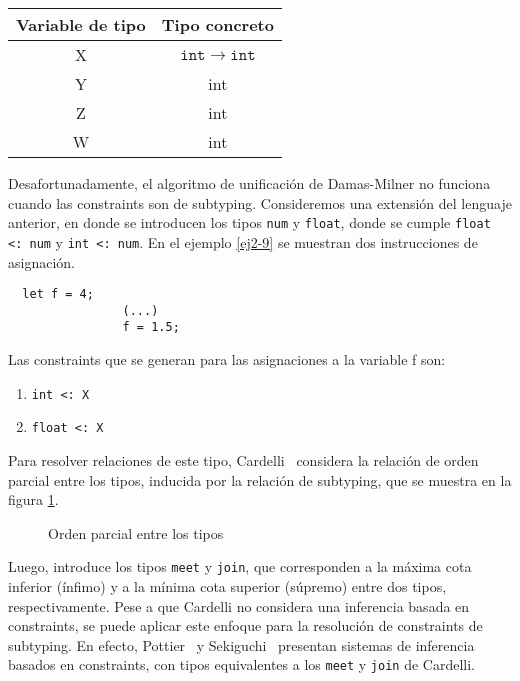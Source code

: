 \begin{center}
  \ttfamily
  \begin{tabular}{c c}
    Variable de tipo & Tipo concreto \\
    \hline
    X & $\mathtt{int \rightarrow int}$  \\
    Y & int \\
    Z & int \\
    W & int \\
  \end{tabular}
\end{center}
\clearpage
Desafortunadamente, el algoritmo de unificación de Damas-Milner no funciona cuando las constraints son de subtyping. Consideremos una extensión del lenguaje anterior,   en donde se introducen los tipos \texttt{num} y \texttt{float}, donde se cumple \texttt{float <: num} y \texttt{int <: num}. En el ejemplo \ref{ej2-9} se muestran dos instrucciones de asignación.
\vspace{0.8em}
\begin{ej}
  \normalfont
  \label{ej2-9}
\begin{lstlisting}
  let f = 4;
                (...)
                f = 1.5;
\end{lstlisting}
\end{ej}

Las constraints que se generan para las asignaciones a la variable f son:

\begin{enumerate}
  \item \texttt{int <: X}
  \item \texttt{float <: X}
\end{enumerate}

Para resolver relaciones de este tipo, Cardelli~\cite{cardelli} considera la relación de orden parcial entre los tipos, inducida por la relación de subtyping, que se muestra en la figura \ref{subt1}.

\begin{figure}[ht]
  \centering
  \caption{Orden parcial entre los tipos}
  \label{subt1}
\end{figure}

Luego, introduce los tipos \texttt{meet} y \texttt{join}, que corresponden a la máxima cota inferior (ínfimo) y a la mínima cota superior (súpremo) entre dos tipos, respectivamente. Pese a que Cardelli no considera una inferencia basada en constraints, se puede aplicar este enfoque para la resolución de constraints de subtyping. En efecto, Pottier~\cite{pottier:inria-00073205} y Sekiguchi~\cite{sekiguchi} presentan sistemas de inferencia basados en constraints, con tipos equivalentes a los \texttt{meet} y \texttt{join} de Cardelli.

